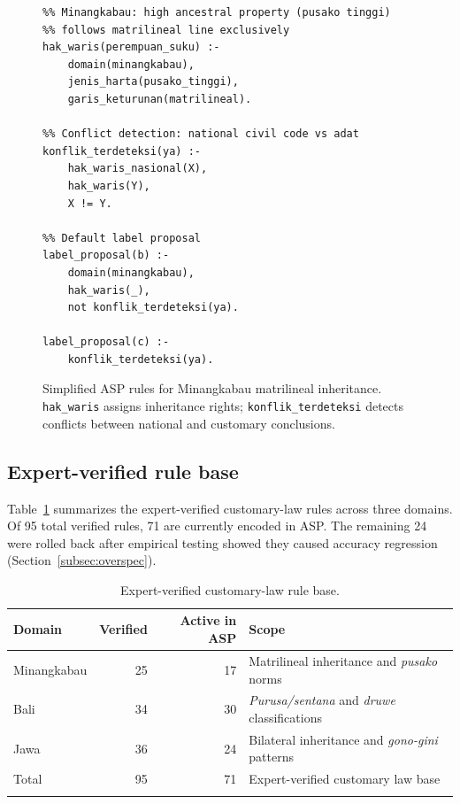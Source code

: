 \documentclass[pdflatex,sn-basic,Numbered]{sn-jnl}
\begin{document}
\begin{figure}[t]
\centering
\small
\begin{verbatim}
%% Minangkabau: high ancestral property (pusako tinggi)
%% follows matrilineal line exclusively
hak_waris(perempuan_suku) :-
    domain(minangkabau),
    jenis_harta(pusako_tinggi),
    garis_keturunan(matrilineal).

%% Conflict detection: national civil code vs adat
konflik_terdeteksi(ya) :-
    hak_waris_nasional(X),
    hak_waris(Y),
    X != Y.

%% Default label proposal
label_proposal(b) :-
    domain(minangkabau),
    hak_waris(_),
    not konflik_terdeteksi(ya).

label_proposal(c) :-
    konflik_terdeteksi(ya).
\end{verbatim}
\caption{Simplified ASP rules for Minangkabau matrilineal inheritance. \texttt{hak\_waris} assigns inheritance rights; \texttt{konflik\_terdeteksi} detects conflicts between national and customary conclusions.}\label{lst:asp-example}
\end{figure}

\subsection{Expert-verified rule base}\label{subsec:rulebase}

Table~\ref{tab:rulebase} summarizes the expert-verified customary-law rules across three domains.
Of 95 total verified rules, 71 are currently encoded in ASP.
The remaining 24 were rolled back after empirical testing showed they caused accuracy regression (Section~\ref{subsec:overspec}).

\begin{table}[t]
\caption{Expert-verified customary-law rule base.}\label{tab:rulebase}
\begin{tabular*}{\textwidth}{@{\extracolsep\fill}lrrl}
\toprule
Domain & Verified & Active in ASP & Scope \\
\midrule
Minangkabau & 25 & 17 & Matrilineal inheritance and \textit{pusako} norms \\
Bali & 34 & 30 & \textit{Purusa/sentana} and \textit{druwe} classifications \\
Jawa & 36 & 24 & Bilateral inheritance and \textit{gono-gini} patterns \\
\midrule
Total & 95 & 71 & Expert-verified customary law base \\
\botrule
\end{tabular*}
\end{table}
\end{document}
